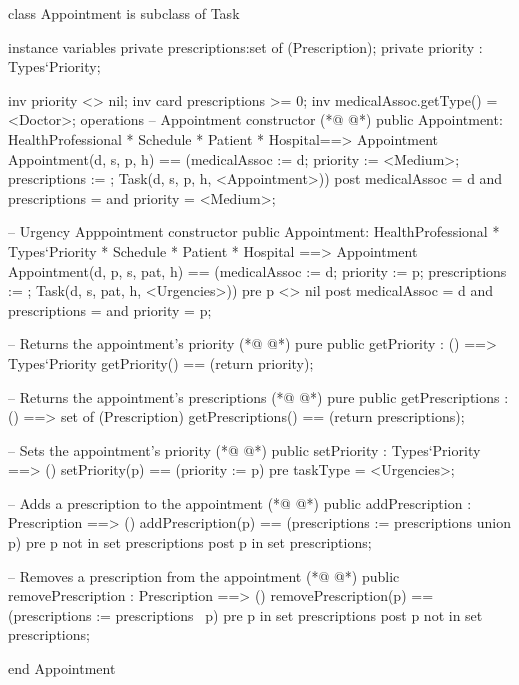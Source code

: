 \begin{vdmpp}[breaklines=true]
class Appointment is subclass of Task

instance variables
  private prescriptions:set of (Prescription);
  private priority : Types`Priority;
  
  inv priority <> nil;
  inv card prescriptions >= 0;
  inv medicalAssoc.getType() = <Doctor>;
operations
 -- Appointment constructor
(*@
\label{Appointment:12}
@*)
 public Appointment: HealthProfessional * Schedule * Patient * Hospital==> Appointment
  Appointment(d, s, p, h) == (medicalAssoc := d; priority := <Medium>; prescriptions := {}; Task(d, s, p, h, <Appointment>))
 post medicalAssoc = d and prescriptions = {} and priority = <Medium>;
 
 -- Urgency Apppointment constructor
 public Appointment: HealthProfessional * Types`Priority * Schedule * Patient * Hospital ==> Appointment
  Appointment(d, p, s, pat, h) == (medicalAssoc := d; priority := p; prescriptions := {}; Task(d, s, pat, h, <Urgencies>))
 pre p <> nil
 post medicalAssoc = d and prescriptions = {} and priority = p;

 -- Returns the appointment's priority
(*@
\label{getPriority:23}
@*)
 pure public getPriority : () ==> Types`Priority
  getPriority() == (return priority);

-- Returns the appointment's prescriptions
(*@
\label{getPrescriptions:27}
@*)
  pure public getPrescriptions : () ==> set of (Prescription)
   getPrescriptions() == (return prescriptions);
  
  -- Sets the appointment's priority
(*@
\label{setPriority:31}
@*)
  public setPriority : Types`Priority ==> ()
   setPriority(p) == (priority := p)
  pre taskType = <Urgencies>;
  
  -- Adds a prescription to the appointment
(*@
\label{addPrescription:36}
@*)
  public addPrescription : Prescription ==> ()
   addPrescription(p) == (prescriptions := prescriptions union {p})
  pre p not in set prescriptions
  post p in set prescriptions;
   
 -- Removes a prescription from the appointment
(*@
\label{removePrescription:42}
@*)
 public removePrescription : Prescription ==> ()
   removePrescription(p) == (prescriptions := prescriptions \ {p})
  pre p in set prescriptions
  post p not in set prescriptions;
   
end Appointment
\end{vdmpp}
\bigskip
